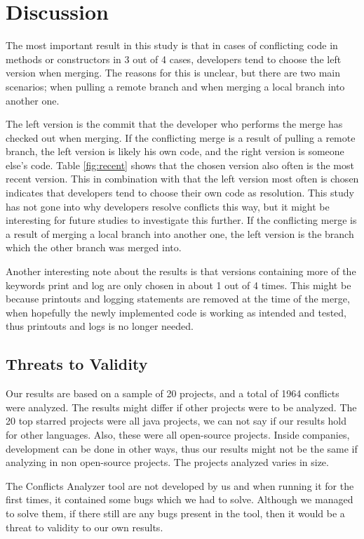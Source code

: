 \section{Discussion}
The most important result in this study is that in cases of conflicting code in methods or constructors in 3 out of 4 cases, developers tend to choose the left version when merging. The reasons for this is unclear, but there are two main scenarios; when pulling a remote branch and when merging a local branch into another one.

The left version is the commit that the developer who performs the merge has checked out when merging. If the conflicting merge is a result of pulling a remote branch, the left version is likely his own code, and the right version is someone else’s code. Table \ref{fig:recent} shows that the chosen version also often is the most recent version. This in combination with that the left version most often is chosen indicates that developers tend to choose their own code as resolution. This study has not gone into why developers resolve conflicts this way, but it might be interesting for future studies to investigate this further. If the conflicting merge is a result of merging a local branch into another one, the left version is the branch which the other branch was merged into.

Another interesting note about the results is that versions containing more of the keywords print and log are only chosen in about 1 out of 4 times. This might be because printouts and logging statements are removed at the time of the merge, when hopefully the newly implemented code is working as intended and tested, thus printouts and logs is no longer needed.

\subsection{Threats to Validity}
Our results are based on a sample of 20 projects, and a total of 1964 conflicts were analyzed. The results might differ if other projects were to be analyzed. The 20 top starred projects were all java projects, we can not say if our results hold for other languages. Also, these were all open-source projects. Inside companies, development can be done in other ways, thus our results might not be the same if analyzing in non open-source projects. The projects analyzed varies in size. 

The Conflicts Analyzer tool are not developed by us and when running it for the first times, it contained some bugs which we had to solve. Although we managed to solve them, if there still are any bugs present in the tool, then it would be a threat to validity to our own results.